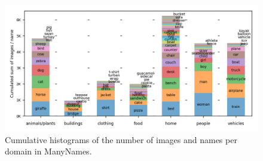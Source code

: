 \begin{figure}[htp]
	\centering
	\includegraphics[scale=.8]{figures/distr_imgs-per-domain_VGMN_v2.png}
	\caption{Cumulative histograms of the number of images and names per domain in ManyNames.}
	\label{fig:overview_dataset1}
\end{figure}

